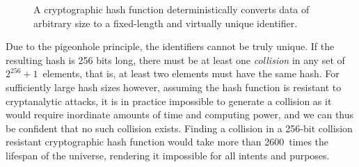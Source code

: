 \begin{figure}
    \begin{center}
    \end{center}
    \caption{A cryptographic hash function deterministically converts data of
    arbitrary size to a fixed-length and virtually unique identifier.}%
\end{figure}

Due to the pigeonhole principle, the identifiers cannot be truly unique. If the
resulting hash is 256 bits long, there must be at least one \emph{collision}
in any set of $2^{256}+1$~elements, that is, at least two elements must have
the same hash. For sufficiently large hash sizes however, assuming the hash
function is resistant to cryptanalytic attacks, it is in practice impossible to
generate a collision as it would require inordinate amounts of time and
computing power, and we can thus be confident that no such collision exists.
Finding a collision in a 256-bit collision resistant cryptographic hash
function would take more than \num{2600}~times the lifespan of the universe,
rendering it impossible for all intents and purposes.

